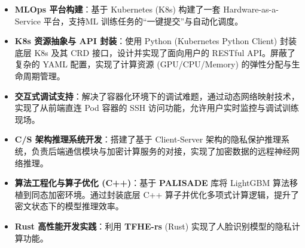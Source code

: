\documentclass{resume}
\begin{document}
\begin{itemize}[parsep=0.3ex]
  \item \textbf{MLOps 平台构建}：基于 Kubernetes (K8s) 构建了一套 Hardware-as-a-Service 平台，支持ML 训练任务的“一键提交”与自动化调度。
  \item \textbf{K8s 资源抽象与 API 封装}：使用 Python (Kubernetes Python Client) 封装底层 K8s 及其 CRD 接口，设计并实现了面向用户的 RESTful API。屏蔽了复杂的 YAML 配置，实现了计算资源 (GPU/CPU/Memory) 的弹性分配与生命周期管理。
  \item \textbf{交互式调试支持}：解决了容器化环境下的调试难题，通过动态网络映射技术，实现了从前端直连 Pod 容器的 SSH 访问功能，允许用户实时监控与调试训练现场。
\end{itemize}
\vspace{0.1cm}

\begin{itemize}[parsep=0.3ex]
  \item \textbf{C/S 架构推理系统开发}：搭建了基于 Client-Server 架构的隐私保护推理系统，负责后端通信模块与加密计算服务的对接，实现了加密数据的远程神经网络推理。
  \item \textbf{算法工程化与算子优化 (C++)}：基于 \textbf{PALISADE} 库将 LightGBM 算法移植到同态加密环境。通过封装底层 C++ 算子并优化多项式计算逻辑，提升了密文状态下的模型推理效率。
  \item \textbf{Rust 高性能开发实践}：利用 \textbf{TFHE-rs} (Rust) 实现了人脸识别模型的隐私计算功能。
\end{itemize}

\end{document}
